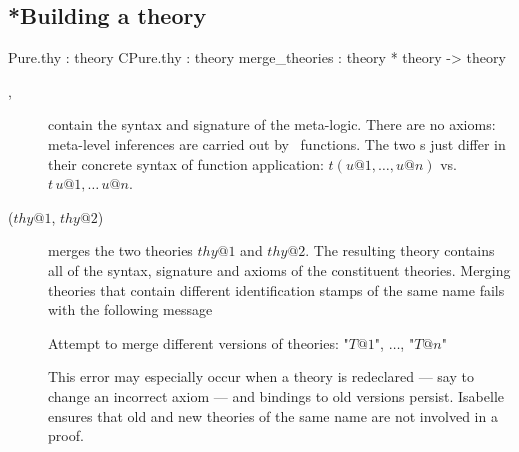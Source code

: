 \subsection{*Building a theory}
\label{BuildingATheory}
\begin{ttbox}
Pure.thy       : theory
CPure.thy      : theory
merge_theories : theory * theory -> theory
\end{ttbox}
\begin{description}
\item[, ] contain the
  syntax and signature of the meta-logic.  There are no axioms:
  meta-level inferences are carried out by \ML\ functions. The two
  \Pure s just differ in their concrete syntax of function
  application: $t(u@1, \ldots, u@n)$ vs.\ $t\,u@1,\ldots\,u@n$.

\item[ ($thy@1$, $thy@2$)] merges the two
  theories $thy@1$ and $thy@2$.  The resulting theory contains all of the
  syntax, signature and axioms of the constituent theories. Merging theories
  that contain different identification stamps of the same name fails with
  the following message
\begin{ttbox}
Attempt to merge different versions of theories: "\(T@1\)", \(\ldots\), "\(T@n\)"
\end{ttbox}
  This error may especially occur when a theory is redeclared --- say to
  change an incorrect axiom --- and bindings to old versions persist.
  Isabelle ensures that old and new theories of the same name are not
  involved in a proof.

\end{description}

